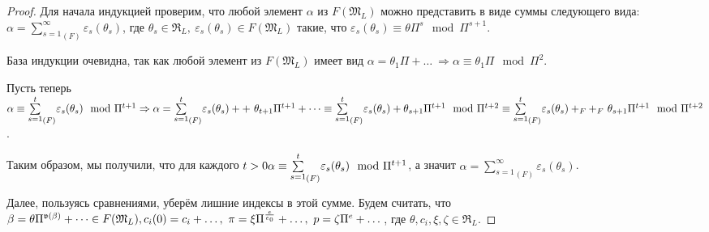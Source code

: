 \documentclass[a4paper]{article}
\newcommand{\ML}{\mathfrak{M}_L}
\newcommand{\RL}{\mathfrak{R}_L}
\newcommand{\val}{\mathfrak{v}}
\begin{document}
\begin{proof}
Для начала индукцией проверим, что любой элемент $\alpha$ из $F(\ML)$ можно представить в виде суммы следующего вида: $\alpha={\sum\limits_{s=1}^\infty}_{(F)}\varepsilon_s(\theta_s)$, где $\theta_s\in\RL,\ \varepsilon_s(\theta_s)\in F(\ML)$ такие, что $\varepsilon_s(\theta_s)\equiv\theta\Pi^s\mod\Pi^{s+1}$.

База индукции очевидна, так как любой элемент из $F(\ML)$ имеет вид $\alpha=\theta_1\Pi+\dots\ \Rightarrow \alpha\equiv\theta_1\Pi\mod\Pi^2$.

Пусть теперь $\alpha\equiv{\sum\limits_{s=1}^t}_{(F)}\varepsilon_s(\theta_s)\mod\Pi^{t+1} \Rightarrow \alpha={\sum\limits_{s=1}^t}_{(F)}\varepsilon_s(\theta_s) +\linebreak+\ \theta_{t+1}\Pi^{t+1}+\dots \equiv {\sum\limits_{s=1}^t}_{(F)}\varepsilon_s(\theta_s) + \theta_{s+1}\Pi^{t+1}\mod\Pi^{t+2}\equiv {\sum\limits_{s=1}^t}_{(F)}\varepsilon_s(\theta_s) +_{F}\linebreak+_{F}\ \theta_{s+1}\Pi^{t+1}\mod\Pi^{t+2}$.

Таким образом, мы получили, что для каждого $t>0\linebreak \alpha\equiv{\sum\limits_{s=1}^t}_{(F)}\varepsilon_s(\theta_s)\mod\Pi^{t+1}$, а значит $\alpha={\sum\limits_{s=1}^\infty}_{(F)}\varepsilon_s(\theta_s)$.

Далее, пользуясь сравнениями, уберём лишние индексы в этой сумме. Будем считать, что $\beta=\theta\Pi^{\val(\beta)}+\dots\in F(\ML),\linebreak c_i(0)=c_i+\dots,\ \pi=\xi\Pi^{e\over e_0}+\dots,\ p=\zeta\Pi^e+\dots$, где $\theta,c_i,\xi,\zeta\in\RL$.


\end{proof}
\end{document}
